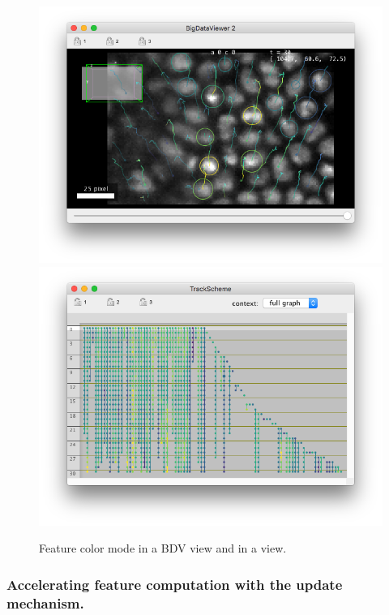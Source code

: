 \begin{figure}
    \centering
    \null\hfill
    \includegraphics[height=0.23\textheight]{figures/Mastodon_FeatureColorBDV.png}
    \hfill
    \includegraphics[height=0.23\textheight]{figures/Mastodon_FeatureColorTrackScheme.png}
    \hfill\null
    
    \caption{Feature color mode in a BDV view and in a \TrackScheme view.  }
    \label{fig:FeatureColorModeView}
\end{figure}




\subsubsection{Accelerating feature computation with the update mechanism.}

